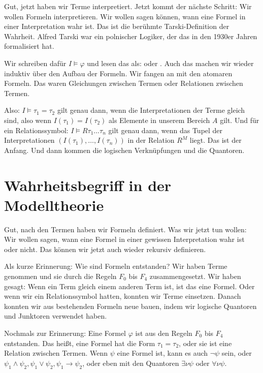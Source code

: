 \begin{spoken-clean}[01:01:05 - 01:04:37]
Gut, jetzt haben wir Terme interpretiert. Jetzt kommt der nächste Schritt: Wir wollen Formeln interpretieren. Wir wollen sagen können, wann eine Formel in einer Interpretation wahr ist. Das ist die berühmte Tarski-Definition der Wahrheit. Alfred Tarski war ein polnischer Logiker, der das in den 1930er Jahren formalisiert hat.

Wir schreiben dafür $I \models \varphi$ und lesen das als:  oder . Auch das machen wir wieder induktiv über den Aufbau der Formeln. Wir fangen an mit den atomaren Formeln. Das waren Gleichungen zwischen Termen oder Relationen zwischen Termen.

Also: $I \models \tau_1 = \tau_2$ gilt genau dann, wenn die Interpretationen der Terme gleich sind, also wenn $I(\tau_1) = I(\tau_2)$ als Elemente in unserem Bereich $A$ gilt. Und für ein Relationssymbol: $I \models R \tau_1 \dots \tau_n$ gilt genau dann, wenn das Tupel der Interpretationen $(I(\tau_1), \dots, I(\tau_n))$ in der Relation $R^M$ liegt. Das ist der Anfang. Und dann kommen die logischen Verknüpfungen und die Quantoren.
\end{spoken-clean}

\section{Wahrheitsbegriff in der Modelltheorie}

\begin{spoken-clean}[01:04:37 - 01:06:57]
Gut, nach den Termen haben wir Formeln definiert. Was wir jetzt tun wollen: Wir wollen sagen, wann eine Formel in einer gewissen Interpretation wahr ist oder nicht. Das können wir jetzt auch wieder rekursiv definieren.

Als kurze Erinnerung: Wie sind Formeln entstanden? Wir haben Terme genommen und sie durch die Regeln $F_0$ bis $F_4$ zusammengesetzt. Wir haben gesagt: Wenn ein Term gleich einem anderen Term ist, ist das eine Formel. Oder wenn wir ein Relationssymbol hatten, konnten wir Terme einsetzen. Danach konnten wir aus bestehenden Formeln neue bauen, indem wir logische Quantoren und Junktoren verwendet haben.

Nochmals zur Erinnerung: Eine Formel $\varphi$ ist aus den Regeln $F_0$ bis $F_4$ entstanden. Das heißt, eine Formel hat die Form $\tau_1 = \tau_2$, oder sie ist eine Relation zwischen Termen. Wenn $\psi$ eine Formel ist, kann es auch $\neg \psi$ sein, oder $\psi_1 \land \psi_2, \psi_1 \lor \psi_2, \psi_1 \to \psi_2$, oder eben mit den Quantoren $\exists \nu \psi$ oder $\forall \nu \psi$.
\end{spoken-clean}

